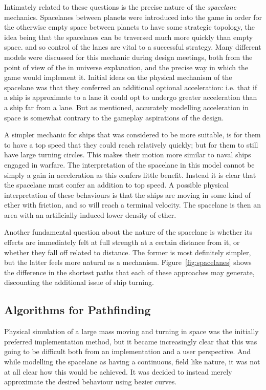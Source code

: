 Intimately related to these questions is the precise nature of the \emph{spacelane} mechanics. Spacelanes between planets were introduced into the game in order for the otherwise empty space between planets to have some strategic topology, the idea being that the spacelanes can be traversed much more quickly than empty space. and so control of the lanes are vital to a successful strategy. Many different models were discussed for this mechanic during design meetings, both from the point of view of the in universe explanation, and the precise way in which the game would implement it. Initial ideas on the physical mechanism of the spacelane was that they conferred an additional optional acceleration: i.e. that if a ship is approximate to a lane it could opt to undergo greater acceleration than a ship far from a lane. But as mentioned, accurately modelling acceleration in space is somewhat contrary to the gameplay aspirations of the design. 

A simpler mechanic for ships that was considered to be more suitable, is for them to have a top speed that they could reach relatively quickly; but for them to still have large turning circles. This makes their motion more similar to naval ships engaged in warfare. The interpretation of the spacelane in this model cannot be simply a gain in acceleration as this confers little benefit. Instead it is clear that the spacelane must confer an addition to top speed. A possible physical interpretation of these behaviours is that the ships are moving in some kind of ether with friction, and so will reach a terminal velocity. The spacelane is then an area with an artificially induced lower density of ether.

Another fundamental question about the nature of the spacelane is whether its effects are immediately felt at full strength at a certain distance from it, or whether they fall off related to distance. The former is most definitely simpler, but the latter feels more natural as a mechanism. Figure~\ref{fig:spacelanes} shows the difference in the shortest paths that each of these approaches may generate, discounting the additional issue of ship turning.

\subsection{Algorithms for Pathfinding}

Physical simulation of a large mass moving and turning in space was the initially preferred implementation method, but it became increasingly clear that this was going to be difficult both from an implementation and a user perspective. And while modelling the spacelane as having a continuous, field like nature, it was not at all clear how this would be achieved. It was decided to instead merely approximate the desired behaviour using bezier curves.

